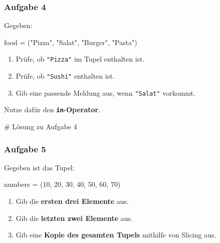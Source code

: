 \documentclass[
  11pt,
  a4paper,
  DIV=11,
  numbers=noendperiod]{scrartcl}
\newenvironment{Shaded}{\begin{snugshade}}{\end{snugshade}}
\newcommand{\CommentTok}[1]{\textcolor[rgb]{0.37,0.37,0.37}{#1}}
\newcommand{\DecValTok}[1]{\textcolor[rgb]{0.68,0.00,0.00}{#1}}
\newcommand{\NormalTok}[1]{\textcolor[rgb]{0.00,0.23,0.31}{#1}}
\newcommand{\OperatorTok}[1]{\textcolor[rgb]{0.37,0.37,0.37}{#1}}
\newcommand{\StringTok}[1]{\textcolor[rgb]{0.13,0.47,0.30}{#1}}
\providecommand{\tightlist}{%
  \setlength{\itemsep}{0pt}\setlength{\parskip}{0pt}}
\begin{document}
\subsubsection{Aufgabe 4}\label{aufgabe-4}

Gegeben:

\begin{Shaded}
\begin{Highlighting}[numbers=left,,]
\NormalTok{food }\OperatorTok{=}\NormalTok{ (}\StringTok{"Pizza"}\NormalTok{, }\StringTok{"Salat"}\NormalTok{, }\StringTok{"Burger"}\NormalTok{, }\StringTok{"Pasta"}\NormalTok{)}
\end{Highlighting}
\end{Shaded}

\begin{enumerate}
\def\labelenumi{\arabic{enumi}.}
\tightlist
\item
  Prüfe, ob \texttt{"Pizza"} im Tupel enthalten ist.\\
\item
  Prüfe, ob \texttt{"Sushi"} enthalten ist.\\
\item
  Gib eine passende Meldung aus, wenn \texttt{"Salat"} vorkommt.
\end{enumerate}

Nutze dafür den \textbf{\texttt{in}-Operator}.

\begin{Shaded}
\begin{Highlighting}[numbers=left,,]
\CommentTok{\# Lösung zu Aufgabe 4}
\end{Highlighting}
\end{Shaded}

\subsubsection{Aufgabe 5}\label{aufgabe-5}

Gegeben ist das Tupel:

\begin{Shaded}
\begin{Highlighting}[numbers=left,,]
\NormalTok{numbers }\OperatorTok{=}\NormalTok{ (}\DecValTok{10}\NormalTok{, }\DecValTok{20}\NormalTok{, }\DecValTok{30}\NormalTok{, }\DecValTok{40}\NormalTok{, }\DecValTok{50}\NormalTok{, }\DecValTok{60}\NormalTok{, }\DecValTok{70}\NormalTok{)}
\end{Highlighting}
\end{Shaded}

\begin{enumerate}
\def\labelenumi{\arabic{enumi}.}
\tightlist
\item
  Gib die \textbf{ersten drei Elemente} aus.\\
\item
  Gib die \textbf{letzten zwei Elemente} aus.\\
\item
  Gib eine \textbf{Kopie des gesamten Tupels} mithilfe von Slicing aus.
\end{enumerate}
\end{document}
